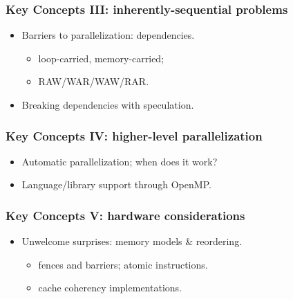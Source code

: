 \documentclass[aspectratio=43]{beamer}
\newenvironment{changemargin}[1]{%
  \begin{list}{}{%
    \setlength{\topsep}{0pt}%
    \setlength{\leftmargin}{#1}%
    \setlength{\rightmargin}{1em}
    \setlength{\listparindent}{\parindent}%
    \setlength{\itemindent}{\parindent}%
    \setlength{\parsep}{\parskip}%
  }%
  \item[]}{\end{list}}
\begin{document}
\begin{frame}
  \frametitle{Key Concepts III: inherently-sequential problems}

  \begin{changemargin}{2cm}
  \begin{itemize}
    \item Barriers to parallelization: dependencies.
      \begin{itemize}
        \item loop-carried, memory-carried;
        \item RAW/WAR/WAW/RAR.
      \end{itemize}

    \item Breaking dependencies with speculation.
  \end{itemize}
  \end{changemargin}
\end{frame}


\begin{frame}
  \frametitle{Key Concepts IV: higher-level parallelization}

  \begin{changemargin}{2cm}
  \begin{itemize}
    \item Automatic parallelization; when does it work?

    \item Language/library support through OpenMP.
  \end{itemize}
  \end{changemargin}
\end{frame}

\begin{frame}
  \frametitle{Key Concepts V: hardware considerations}

  \begin{changemargin}{2cm}
  \begin{itemize}
    \item Unwelcome surprises: memory models \& reordering.
      \begin{itemize}
        \item fences and barriers; atomic instructions.
        \item cache coherency implementations.
      \end{itemize}
  \end{itemize}
  \end{changemargin}
\end{frame}
\end{document}

